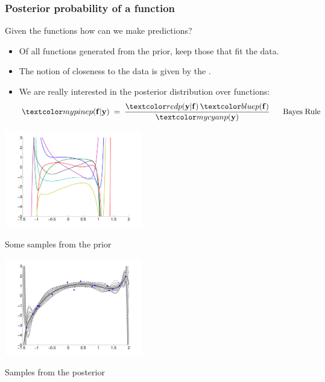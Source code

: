 \begin{frame}
\frametitle{Posterior probability of a function}

Given the   functions  how can we make predictions?
\begin{itemize}
\item Of all functions generated from the prior, keep those that fit the data.
\item The notion of closeness to the data is given by the .
\item We are really interested in the posterior distribution over functions:
%
\[
\Green{p(\bff|\bfy)}\;=\;\frac{\Red{p(\bfy|\bff)}\,\Blue{p(\bff)}}{\Cyan{p(\bfy)}}
{\; \; \; \; \; \;} \mathrm{Bayes\; Rule}
\]
%
\end{itemize}

\parbox{0.45\textwidth}{
\centerline{\includegraphics[width=0.45\textwidth]{random_polynomials_degree17.pdf}}
\centerline{Some samples from the prior}
}
\parbox{0.45\textwidth}{
\centerline{\includegraphics[width=0.45\textwidth]{samples_posterior_degree17.pdf}}
\centerline{Samples from the posterior}
}
\end{frame}


